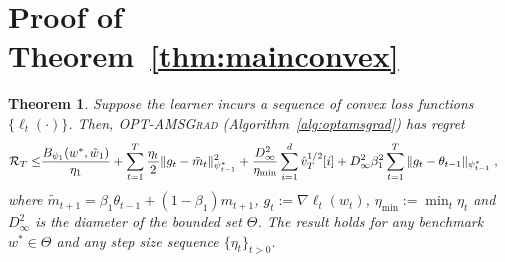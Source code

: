 \documentclass[11pt]{article}
\newtheorem*{Theorem*}{Theorem}
\theoremstyle{k}
\begin{document}
\clearpage




\clearpage


\appendix
\section{Proof of Theorem~\ref{thm:mainconvex}}\label{app:thmmainconvex}
\begin{Theorem*}
Suppose the learner incurs a sequence of convex loss functions $\{ \ell_{t}(\cdot) \}$.
Then,  \textsc{OPT-AMSGrad} (Algorithm~\ref{alg:optamsgrad}) has regret 
\begin{equation} \label{bound:optadabeta}
\begin{aligned}
\mathcal{R}_T \leq &   \frac{ B_{\psi_1}(w^*, \tilde{w}_{1})}{\eta_1}
+ \sum_{t=1}^T\frac{\eta_t}{2} \| g_t - \tilde{m}_t  \|_{\psi_{t-1}^*}^2  + \frac{D_{\infty}^2}{\eta_{\min}}  \sum_{i=1}^d \hat{v}_{T}^{1/2}[i] + D_{\infty}^2\beta_1^2   \sum_{t=1}^T  \| g_t - \theta_{t-1}  \|_{\psi_{t-1}^*}\;,
\end{aligned}
\end{equation}
where $ \tilde{m}_{t+1}  = \beta_1 \theta_{t-1} +(1-\beta_1) m_{t+1}$, $g_{t}:= \nabla \ell_{t}(w_t)$, $\eta_{{\min}} := \min_{{t}} \eta_{t}$ and $D_{\infty}^2$ is the diameter of the bounded set $\Theta$.
The result holds for any benchmark $w^{*} \in \Theta$ and any step size sequence $\{ \eta_t \}_{t>0}$.
\end{Theorem*}
\end{document}
